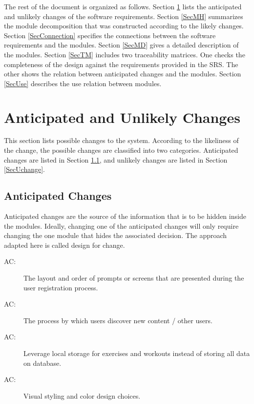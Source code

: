 \documentclass[12pt, titlepage]{article}
\newcounter{acnum}
\newcommand{\actheacnum}{AC\theacnum}
\begin{document}
The rest of the document is organized as follows. Section
\ref{SecChange} lists the anticipated and unlikely changes of the software
requirements. Section \ref{SecMH} summarizes the module decomposition that
was constructed according to the likely changes. Section \ref{SecConnection}
specifies the connections between the software requirements and the
modules. Section \ref{SecMD} gives a detailed description of the
modules. Section \ref{SecTM} includes two traceability matrices. One checks
the completeness of the design against the requirements provided in the SRS. The
other shows the relation between anticipated changes and the modules. Section
\ref{SecUse} describes the use relation between modules.

\section{Anticipated and Unlikely Changes} \label{SecChange}

This section lists possible changes to the system. According to the likeliness
of the change, the possible changes are classified into two
categories. Anticipated changes are listed in Section \ref{SecAchange}, and
unlikely changes are listed in Section \ref{SecUchange}.

\subsection{Anticipated Changes} \label{SecAchange}

Anticipated changes are the source of the information that is to be hidden
inside the modules. Ideally, changing one of the anticipated changes will only
require changing the one module that hides the associated decision. The approach
adapted here is called design for
change.

\begin{description}
\item[ \actheacnum :] The layout and order of prompts or screens that are presented during the user registration process.
\item[ \actheacnum :] The process by which users discover new content / other users.
\item[ \actheacnum :] Leverage local storage for exercises and workouts instead of storing all data on database. 
\item[ \actheacnum :] Visual styling and color design choices.
\end{description}
\end{document}
